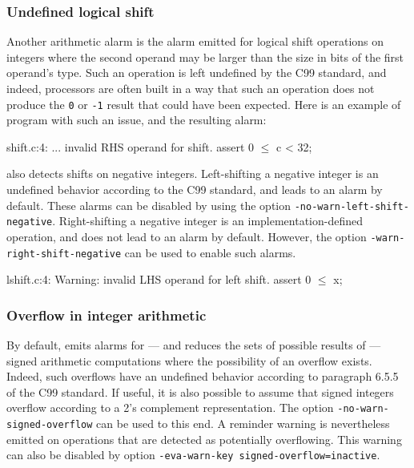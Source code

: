 \documentclass{frama-c-book}
\newcommand{\isoc}{\textsf{C99}}
\begin{document}
\subsubsection{Undefined logical shift}
Another arithmetic alarm is the alarm emitted for logical
shift operations on integers where the second operand may be
larger than the size in bits of the first operand's type.
Such an operation is left undefined by the \isoc{} standard, and
indeed, processors are often built in a way that such an
operation does not produce the \lstinline|0| or \lstinline|-1|
result that could have been expected. Here is an example
of program with such an issue, and the resulting alarm:
\begin{logsmath}
shift.c:4: ... invalid RHS operand for shift. assert 0 $\le$ c < 32;
\end{logsmath}

\Eva{} also detects shifts on negative integers.
Left-shifting a negative integer is an undefined behavior according to the
\isoc{} standard, and leads to an alarm by default.
These alarms can be disabled by using the option
\lstinline|-no-warn-left-shift-negative|.
Right-shifting a negative integer is an implementation-defined operation,
and does not lead to an alarm by default.
However, the option \lstinline|-warn-right-shift-negative| can be used to
enable such alarms.

\begin{logsmath}
 lshift.c:4: Warning:
  invalid LHS operand for left shift. assert 0 $\le$ x;
\end{logsmath}

\subsubsection{Overflow in integer arithmetic}

By default, \Eva{} emits alarms for --- and reduces the
sets of possible results of --- signed arithmetic computations where
the possibility of an overflow exists. Indeed,
such overflows have an undefined behavior according to
paragraph 6.5.5 of the \isoc{} standard.
%
If useful, it is also possible to assume that signed integers overflow
according to a 2's complement representation. The option
\lstinline|-no-warn-signed-overflow| can be used to this end. A
reminder warning is nevertheless emitted on operations that are detected
as potentially overflowing. This warning can also be disabled by option
\lstinline|-eva-warn-key signed-overflow=inactive|.
\end{document}
